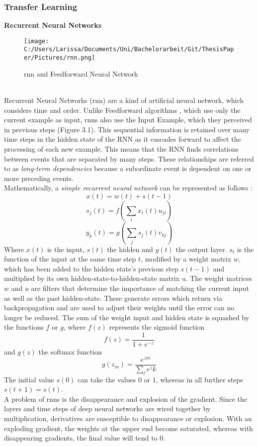 \documentclass[a4paper, 11pt,titlepage,oneside,openany]{book}
\begin{document}
\subsubsection{Transfer Learning}
\textbf{Recurrent Neural Networks}
\begin{figure}[h]
	\centering
	\texttt{[image: C:/Users/Larissa/Documents/Uni/Bachelorarbeit/Git/ThesisPaper/Pictures/rnn.png]}
	\caption{\gls{rnn} and Feedforward Neural Network \cite{rnn}}
\end{figure}\\
Recurrent Neural Networks (\gls{rnn}) are a kind of artificial neural network, which considers time and order. Unlike Feedforward algorithms \cite{feedforward}, which use only the current example as input, \gls{rnn}s also use the Input Example, which they perceived in previous steps (Figure 3.1). 
This sequential information is retained over many time steps in the hidden state of the RNN as it cascades forward to affect the processing of each new example. This means that the RNN finds correlations between events that are separated by many steps. These relationships are referred to as \textit{long-term dependencies} because a subordinate event is dependent on one or more preceding events.\\
\newpage
\noindent Mathematically, a \textit{simple recurrent neural network} \cite{ELMAN1990179} can be represented as follows \cite{rnnmodel}:
\[
x(t)=w(t)+s(t-1)
\]
\[
s_j(t)=f(\sum_{i}x_i(t)u_{ji})
\]
\[
y_k(t)=g(\sum_{j}s_j(t)v_{kj})
\]
Where $x(t)$ is the input, $s(t)$ the hidden and $y(t)$ the output layer. $s_t$ is the function of the input at the same time step $t$, modified by a weight matrix $w$, which has been added to the hidden state's previous step $s(t-1)$ and multiplied by its own hidden-state-to-hidden-state matrix $u$. The weight matrices $w$ and $u$ are filters that determine the importance of matching the current input as well as the past hidden-state. These generate errors which return via backpropagation and are used to adjust their weights until the error can no longer be reduced. The sum of the weight input and hidden state is squashed by the functions $f$ or $g$, where  $f(z)$ represents the sigmoid function
\[
f(z)=\frac{1}{1+e^{-z}}
\]
and $g(z)$ the softmax function
\[
g(z_m)=\frac{e^{zm}}{\sum_{l}e^zk}
\]
The initial value $s(0)$ can take the values 0 or 1, whereas in all further steps $s(t+1)=s(t)$. \\
\noindent A problem of \gls{rnn}s is the disappearance and explosion of the gradient. Since the layers and time steps of deep neural networks are wired together by multiplication, derivatives are susceptible to disappearance or explosion. With an exploding gradient, the weights at the upper end become saturated, whereas with disappearing gradients, the final value will tend to 0. \\
\end{document}
